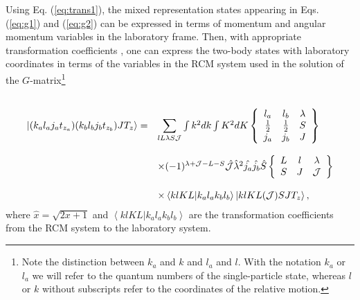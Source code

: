 Using Eq. (\ref{eq:trans1}), the mixed representation states appearing
in  Eqs. (\ref{eq:g1}) and 
(\ref{eq:g2}) can be expressed in terms of momentum and angular
momentum variables in the laboratory frame. 
Then, with appropriate transformation coefficients  \cite{kkr79,wc72}, 
one can express
the two-body states with laboratory coordinates in terms of the
variables in the RCM system used in the solution of the 
$G$-matrix\footnote{Note the distinction between
$k_a$ and $k$ and $l_a$ and $l$. With the notation $k_a$
or $l_a$ we will refer to the quantum numbers of the single-particle
state, whereas $l$ or $k$ without subscripts refer to the coordinates  
of the relative motion.}
 
\begin{equation}
   \begin{array}{ll}
     &\\
     \left | (k_al_aj_at_{z_a})(k_bl_bj_bt_{z_b})JT_z\right \rangle =&
      {\displaystyle \sum_{lL\lambda S{\cal J}}}\int k^{2}dk\int K^{2}dK
      \left\{\begin{array}{ccc}
      l_a&l_b&\lambda\\\frac{1}{2}&\frac{1}{2}&S\\
      j_a&j_b&J\end{array}
      \right\}\\&\\
      &\times (-1)^{\lambda +{\cal J}-L-S}
      \hat{{\cal J}}\hat{\lambda}^{2}
      \hat{j_{a}}\hat{j_{b}}\hat{S}
      \left\{\begin{array}{ccc}L&l&\lambda\\S&J&{\cal J}
      \end{array}\right\}\\&\\
      &\times \left\langle klKL| k_al_ak_bl_b\right\rangle
      \left | klKL({\cal J})SJT_z\right \rangle ,
   \end{array}
\end{equation}
where $\hat{x}=\sqrt{2x+1}$ and  $\left\langle klKL|
k_al_ak_bl_b\right\rangle$ are
the transformation coefficients from the RCM system to the laboratory 
system.


